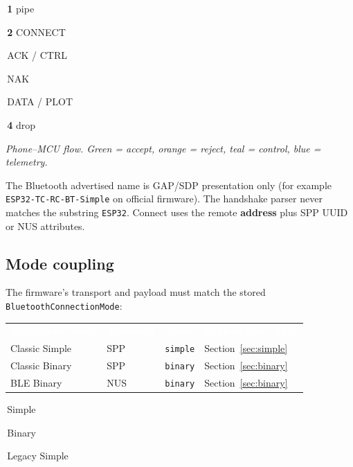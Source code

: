 \documentclass[12pt,a4paper]{article}
\newcommand{\thc}[1]{\textcolor{white}{\bfseries #1}}
\newcommand{\chip}[2]{\colorbox{#1}{\strut\,\scriptsize #2\,}}
\begin{document}
\begin{center}

\vspace{0.3em}
{\sffamily\scriptsize
\chip{TblHead!18}{\textcolor{TblHead}{\textbf{1} pipe}}
\chip{TblSync}{\textbf{2} CONNECT}
\chip{TblChan}{ACK / CTRL}
\chip{TblId}{NAK}
\chip{TblTelem}{DATA / PLOT}
\chip{TblSum}{\textbf{4} drop}}

\vspace{0.15em}
{\sffamily\scriptsize\itshape
Phone--MCU flow. Green = accept, orange = reject, teal = control, blue = telemetry.}
\end{center}

The Bluetooth advertised name is GAP/SDP presentation only
(for example \texttt{ESP32-TC-RC-BT-Simple} on official firmware).
The handshake parser never matches the substring \texttt{ESP32}.
Connect uses the remote \textbf{address} plus SPP UUID or NUS attributes.

\subsection{Mode coupling}

The firmware's transport and payload must match the stored
\texttt{BluetoothConnectionMode}:

\begin{center}
\renewcommand{\arraystretch}{1.25}
\begin{tabular}{>{\raggedright\arraybackslash}p{3.5cm}
                >{\centering\arraybackslash}p{2.3cm}
                >{\centering\arraybackslash}p{1.8cm}
                >{\raggedright\arraybackslash}p{3.8cm}}
\rowcolor{TblHead}
\thc{Application mode} & \thc{Transport} & \thc{proto} & \thc{Payload after ACK} \\
\rowcolor{TblChan}
Classic Simple & SPP & \texttt{simple} & Section~\ref{sec:simple} \\
\rowcolor{TblTelem}
Classic Binary & SPP & \texttt{binary} & Section~\ref{sec:binary} \\
\rowcolor{TblTelem}
BLE Binary & NUS & \texttt{binary} & Section~\ref{sec:binary} \\
\end{tabular}

\vspace{0.4em}
\chip{TblChan}{Simple}
\chip{TblTelem}{Binary}
\chip{TblId}{Legacy Simple}
\end{center}
\end{document}
